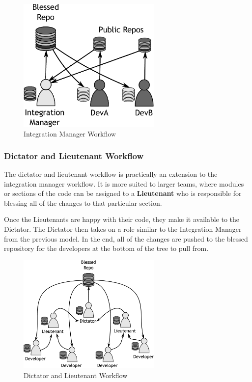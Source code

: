 \begin{figure}[bt]
	\centering
	\includegraphics[width=7cm]{images/f-w1-d2.pdf}
	\caption{Integration Manager Workflow}
\end{figure}

\subsubsection{Dictator and Lieutenant Workflow}

The dictator and lieutenant workflow is practically an extension to the integration manager workflow.  It is more suited to larger teams, where modules or sections of the code can be assigned to a \textbf{Lieutenant} who is responsible for blessing all of the changes to that particular section.

Once the Lieutenants are happy with their code, they make it available to the Dictator.  The Dictator then takes on a role similar to the Integration Manager from the previous model.  In the end, all of the changes are pushed to the blessed repository for the developers at the bottom of the tree to pull from.

\begin{figure}[bt]
	\centering
	\includegraphics[width=7cm]{images/f-w1-d3.pdf}
	\caption{Dictator and Lieutenant Workflow}
\end{figure}

